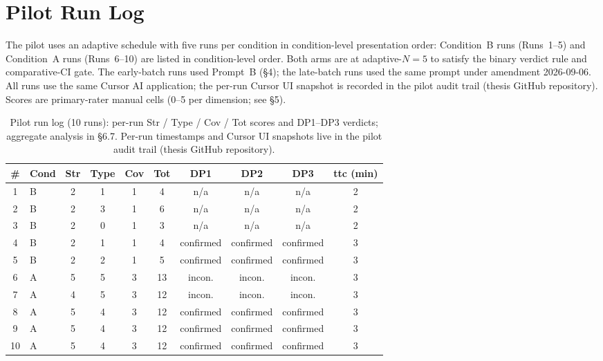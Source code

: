 
\section{Pilot Run Log}

The pilot uses an adaptive schedule with five runs per condition in condition-level presentation order: Condition~B runs (Runs~1--5) and Condition~A runs (Runs~6--10) are listed in condition-level order. Both arms are at adaptive-$N=5$ to satisfy the binary verdict rule and comparative-CI gate. The early-batch runs used Prompt~B (\S4); the late-batch runs used the same prompt under amendment 2026-09-06. All runs use the same Cursor AI application; the per-run Cursor UI snapshot is recorded in the pilot audit trail (thesis GitHub repository). Scores are primary-rater manual cells (0--5 per dimension; see \S5).

\begin{table}[H]
\centering
\scriptsize
\setlength{\tabcolsep}{3pt}
\begin{tabular}{clcccccccc}
\toprule
\textbf{\#} & \textbf{Cond} & \textbf{Str} & \textbf{Type} & \textbf{Cov} & \textbf{Tot} & \textbf{DP1} & \textbf{DP2} & \textbf{DP3} & \textbf{ttc (min)} \\
\midrule
1 & B & 2 & 1 & 1 & 4  & n/a & n/a & n/a & 2 \\
2 & B & 2 & 3 & 1 & 6  & n/a & n/a & n/a & 2 \\
3 & B & 2 & 0 & 1 & 3  & n/a & n/a & n/a & 2 \\
4 & B & 2 & 1 & 1 & 4  & confirmed & confirmed & confirmed & 3 \\
5 & B & 2 & 2 & 1 & 5  & confirmed & confirmed & confirmed & 3 \\
\midrule
6 & A & 5 & 5 & 3 & 13 & incon. & incon. & incon. & 3 \\
7 & A & 4 & 5 & 3 & 12 & incon. & incon. & incon. & 3 \\
8 & A & 5 & 4 & 3 & 12 & confirmed & confirmed & confirmed & 3 \\
9 & A & 5 & 4 & 3 & 12 & confirmed & confirmed & confirmed & 3 \\
10 & A & 5 & 4 & 3 & 12 & confirmed & confirmed & confirmed & 3 \\
\bottomrule
\end{tabular}
\caption{Pilot run log (10 runs): per-run Str / Type / Cov / Tot scores and DP1--DP3 verdicts; aggregate analysis in \S6.7. Per-run timestamps and Cursor UI snapshots live in the pilot audit trail (thesis GitHub repository).}
\label{tab:pilot-run-log}
\end{table}

